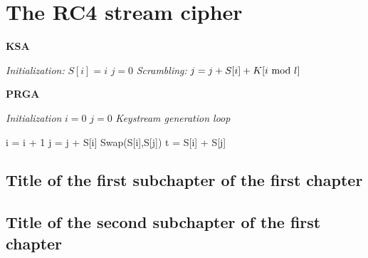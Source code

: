 \chapter{The RC4 stream cipher}
\renewcommand{\thealgorithm}{}


\begin{algorithm}
\caption{\textbf{KSA}}
\label{ksa}
\begin{algorithmic}
\State \textit{Initialization:}
	\State $S[i] = i$
\EndFor
\State $j = 0$
\State \textit{Scrambling:}
	\State $j = j + S[i] + K[i\ \text{mod}\ l]$
\EndFor
\State {}
\end{algorithmic}	
\end{algorithm}



\begin{algorithm}
\caption{\textbf{PRGA}}
\label{prga}
\begin{algorithmic}
\State \textit{Initialization}
\State $i = 0$
\State $j = 0$
\State \textit{Keystream generation loop}

\State i = i + 1
\State j = j + S[i]
\State Swap(S[i],S[j])
\State t = S[i] + S[j]
\State{}

\end{algorithmic}
\end{algorithm}

\section{Title of the first subchapter of the first chapter}

\section{Title of the second subchapter of the first chapter}
